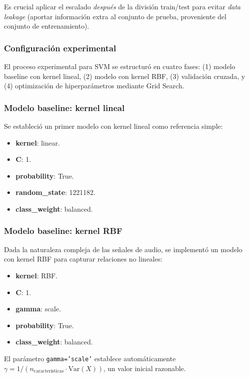 Es crucial aplicar el escalado \textit{después} de la división train/test para evitar \textit{data leakage} (aportar información extra al conjunto de prueba, proveniente del conjunto de entrenamiento).

\subsubsection*{Configuración experimental}

El proceso experimental para SVM se estructuró en cuatro fases: (1) modelo baseline con kernel lineal, (2) modelo con kernel RBF, (3) validación cruzada, y (4) optimización de hiperparámetros mediante Grid Search.

\subsubsection*{Modelo baseline: kernel lineal}
Se estableció un primer modelo con kernel lineal como referencia simple:

\begin{itemize}
	\item \textbf{kernel}: linear.
	\item \textbf{C}: 1.
	\item \textbf{probability}: True.
	\item \textbf{random\_state}: 1221182.
	\item \textbf{class\_weight}: balanced.
\end{itemize}

\subsubsection*{Modelo baseline: kernel RBF}

Dada la naturaleza compleja de las señales de audio, se implementó un modelo con kernel RBF para capturar relaciones no lineales:

\begin{itemize}
	\item \textbf{kernel}: RBF.
	\item \textbf{C}: 1.
	\item \textbf{gamma}: scale.
	\item \textbf{probability}: True.
	\item \textbf{class\_weight}: balanced.
\end{itemize}

El parámetro \texttt{gamma='scale'} establece automáticamente \(\gamma = 1/(n_{\text{características}} \cdot \text{Var}(X))\), un valor inicial razonable.

